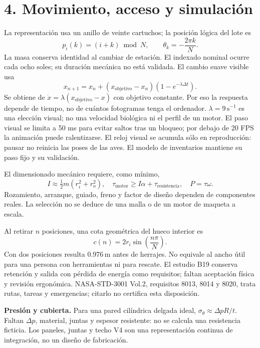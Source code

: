\documentclass[11pt,a4paper]{article}
\begin{document}
\newpage
\section*{4. Movimiento, acceso y simulación}
La representación usa un anillo de veinte cartuchos; la posición lógica del lote es
\begin{equation}
 p_i(k)=(i+k)\bmod N,\qquad \theta_k=-\frac{2\pi k}{N}.
\end{equation}
La masa conserva identidad al cambiar de estación. El indexado nominal ocurre cada
ocho soles; su duración mecánica no está validada. El cambio suave visible usa
\begin{equation}
 x_{n+1}=x_n+(x_{\mathrm{objetivo}}-x_n)(1-e^{-\lambda\Delta t}).
\end{equation}
Se obtiene de $\dot x=\lambda(x_{\mathrm{objetivo}}-x)$ con objetivo constante. Por eso
la respuesta depende de tiempo, no de cuántos fotogramas tenga el ordenador.
$\lambda=9\,\mathrm{s^{-1}}$ es una elección visual; no una velocidad biológica ni el
perfil de un motor. El paso visual se limita a 50 ms para evitar saltos tras un bloqueo;
por debajo de 20 FPS la animación puede ralentizarse. El reloj visual se acumula sólo en reproducción: pausar no reinicia
las poses de las aves. El modelo de inventarios mantiene su paso fijo y su validación.

El dimensionado mecánico requiere, como mínimo,
\begin{equation}
 I\approx\tfrac12m(r_i^2+r_o^2),\quad
 \tau_{\mathrm{motor}}\geq I\alpha+\tau_{\mathrm{resistencia}},\quad P=\tau\omega.
\end{equation}
Rozamiento, arranque, guiado, freno y factor de diseño dependen de componentes reales.
La selección no se deduce de una malla o de un motor de maqueta a escala.

Al retirar $n$ posiciones, una cota geométrica del hueco interior es
\begin{equation}c(n)=2r_i\sin\!\left(\frac{n\pi}{N}\right).
\end{equation}
Con dos posiciones resulta $0.976\,\mathrm m$ antes de herrajes. No equivale al ancho
útil para una persona con herramientas ni para rescate. El estudio B19 conserva
retención y salida con pérdida de energía como requisitos; faltan aceptación física
y revisión ergonómica. NASA-STD-3001 Vol.2, requisitos 8013, 8014 y 8020, trata rutas,
tareas y emergencias; citarlo no certifica esta disposición.

\textbf{Presión y cubierta.} Para una pared cilíndrica delgada ideal,
$\sigma_\theta\approx\Delta pR/t$. Faltan $\Delta p$, material, juntas y espesor resistente:
no se calcula una resistencia ficticia. Los paneles, juntas y techo V4 son una
representación continua de integración, no un diseño de fabricación.
\end{document}
